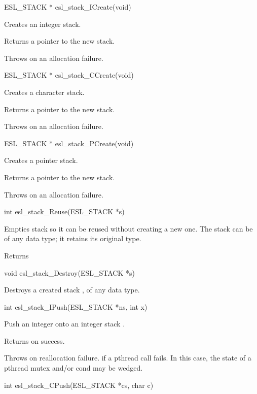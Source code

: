 \begin{sreapi}
\hypertarget{func:esl_stack_ICreate()}
{\item[ESL\_STACK * esl\_stack\_ICreate(void)]}

Creates an integer stack.

Returns a pointer to the new stack.

Throws  on an allocation failure.


\hypertarget{func:esl_stack_CCreate()}
{\item[ESL\_STACK * esl\_stack\_CCreate(void)]}

Creates a character stack.

Returns a pointer to the new stack.

Throws  on an allocation failure.


\hypertarget{func:esl_stack_PCreate()}
{\item[ESL\_STACK * esl\_stack\_PCreate(void)]}

Creates a pointer stack.

Returns a pointer to the new stack.

Throws  on an allocation failure.


\hypertarget{func:esl_stack_Reuse()}
{\item[int esl\_stack\_Reuse(ESL\_STACK *s)]}

Empties stack  so it can be reused without
creating a new one. The stack 
can be of any data type; it retains its original
type.

Returns 


\hypertarget{func:esl_stack_Destroy()}
{\item[void esl\_stack\_Destroy(ESL\_STACK *s)]}

Destroys a created stack , of any data type.


\hypertarget{func:esl_stack_IPush()}
{\item[int esl\_stack\_IPush(ESL\_STACK *ns, int x)]}

Push an integer  onto an integer stack .

Returns  on success.

Throws  on reallocation failure.
 if a pthread call fails. In this case, the
state of a pthread mutex and/or cond may be wedged.             


\hypertarget{func:esl_stack_CPush()}
{\item[int esl\_stack\_CPush(ESL\_STACK *cs, char c)]}


\end{sreapi}
